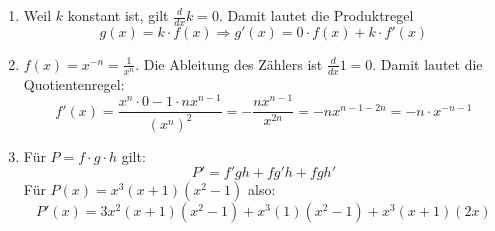 \begin{enumerate}
\begin{enumerate}
		            \textbf{Wichtig:} Die folgende verführerische Umformung ist falsch $\frac{x^2+3x-1}{x+1} \neq \frac{x^2+3x-1}{x} + \frac{x^2+3x-1}{1}$  \end{enumerate}



	\item Weil $k$ konstant ist, gilt $\frac{d}{dx}k = 0$. Damit lautet die Produktregel
	      $$ g(x) = k \cdot f(x) \Rightarrow g'(x) = 0 \cdot f(x) + k \cdot f'(x) $$

	\item \( f(x) = x^{-n} = \frac{1}{x^n}\). Die Ableitung des Zählers ist $\frac{d}{dx}1 = 0$. Damit lautet die Quotientenregel:
	      $$f'(x) = \frac{x^n \cdot 0 - 1\cdot n x^{n-1}}{(x^n)^2} = -\frac{nx^{n-1}}{x^{2n}} = -n x^{n-1-2n} = -n \cdot x^{-n-1}$$

	\item Für \( P = f \cdot g \cdot h \) gilt:
	      \[
		      P' = f'gh + fg'h + fgh'
	      \]
	      Für \( P(x) = x^3(x + 1)(x^2 - 1) \) also:
	      \[
		      P'(x) = 3x^2(x+1)(x^2-1) + x^3(1)(x^2-1) + x^3(x+1)(2x)
	      \]
\end{enumerate}
\clearpage




































